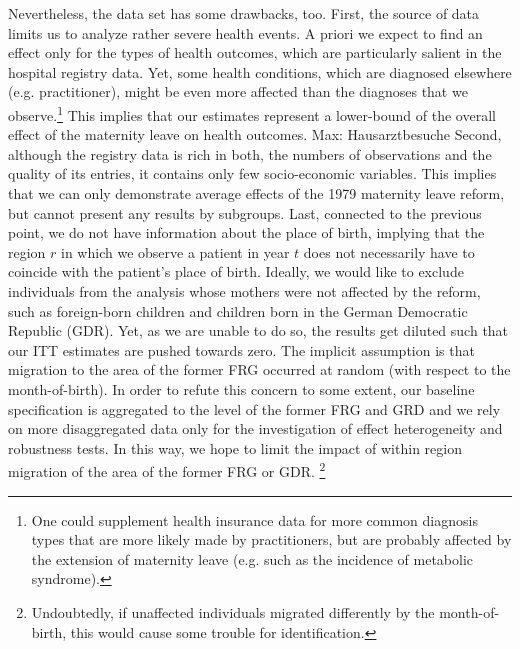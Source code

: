 \documentclass[11pt, a4paper]{article} %
\begin{document}
Nevertheless, the data set has some drawbacks, too. First, the source of data limits us to analyze rather severe health events. A priori we expect to find an effect only for the types of health outcomes, which are particularly salient in the hospital registry data. Yet, some health conditions, which are diagnosed elsewhere (e.g. practitioner), might be even more affected than the diagnoses that we observe.\footnote{One could supplement health insurance data for more common diagnosis types that are more likely made by practitioners, but are probably affected by the extension of maternity leave (e.g. such as the incidence of metabolic syndrome).} This implies that our estimates represent a lower-bound of the overall effect of the maternity leave on health outcomes. {\color{red} Max: Hausarztbesuche}\newline%
 Second, although the registry data is rich in both, the numbers of observations and the quality of its entries, it contains only few socio-economic variables. This implies that we can only demonstrate average effects of the 1979 maternity leave reform, but cannot present any results by subgroups. Last, connected to the previous point, we do not have information about the place of birth, implying that the region $r$ in which we observe a patient in year $t$ does not necessarily have to coincide with the patient's place of birth. Ideally, we would like to exclude individuals from the analysis whose mothers were not affected by the reform, such as foreign-born children and children born in the German Democratic Republic (GDR). Yet, as we are unable to do so, the results get diluted such that our ITT estimates are pushed towards zero. The implicit assumption is that migration to the area of the former FRG occurred at random (with respect to the month-of-birth). In order to refute this concern to some extent, our baseline specification is aggregated to the level of the former FRG and GRD and we rely on more disaggregated data only for the investigation of effect heterogeneity and robustness tests. In this way, we hope to limit the impact of within region migration of the area of the former FRG or GDR. \footnote{Undoubtedly, if unaffected individuals migrated differently by the month-of-birth, this would cause some trouble for identification.}\newline
\end{document}

